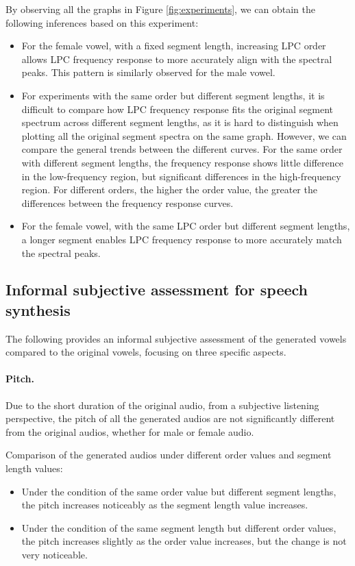 \documentclass{article}
\begin{document}
By observing all the graphs in Figure \ref{fig:experiments}, we can obtain the following inferences based on this experiment: 
\begin{itemize}
  \item For the female vowel, with a fixed segment length, increasing LPC order allows LPC frequency response to more accurately align with the spectral peaks. This pattern is similarly observed for the male vowel.
  \item For experiments with the same order but different segment lengths, it is difficult to compare how LPC frequency response fits the original segment spectrum across different segment lengths, as it is hard to distinguish when plotting all the original segment spectra on the same graph. However, we can compare the general trends between the different curves. For the same order with different segment lengths, the frequency response shows little difference in the low-frequency region, but significant differences in the high-frequency region. For different orders, the higher the order value, the greater the differences between the frequency response curves.
  \item For the female vowel, with the same LPC order but different segment lengths, a longer segment enables LPC frequency response to more accurately match the spectral peaks.
\end{itemize}

\subsection{Informal subjective assessment for speech synthesis}

The following provides an informal subjective assessment of the generated vowels compared to the original vowels, focusing on three specific aspects.

\paragraph{Pitch.}
Due to the short duration of the original audio, from a subjective listening perspective, the pitch of all the generated audios are not significantly different from the original audios, whether for male or female audio.

Comparison of the generated audios under different order values and segment length values:
\begin{itemize}
  \item Under the condition of the same order value but different segment lengths, the pitch increases noticeably as the segment length value increases.
  \item Under the condition of the same segment length but different order values, the pitch increases slightly as the order value increases, but the change is not very noticeable.
\end{itemize}
\end{document}
